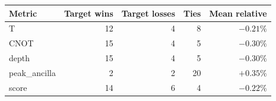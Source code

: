 \begin{tabular}{lrrrr}
\toprule
Metric & Target wins & Target losses & Ties & Mean relative \\
\midrule
T & 12 & 4 & 8 & $-0.21\%$ \\
CNOT & 15 & 4 & 5 & $-0.30\%$ \\
depth & 15 & 4 & 5 & $-0.30\%$ \\
peak_ancilla & 2 & 2 & 20 & $+0.35\%$ \\
score & 14 & 6 & 4 & $-0.22\%$ \\
\bottomrule
\end{tabular}
